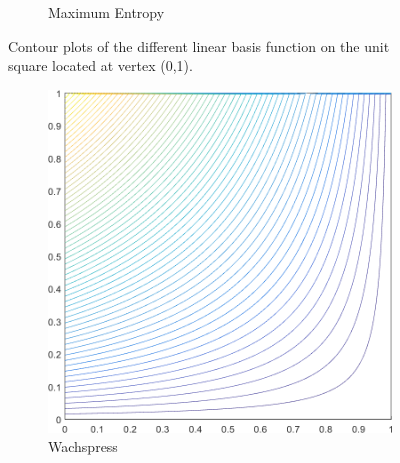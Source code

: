 \begin{figure}
{\begin{subfigure}[b]{0.39\textwidth}
		\caption{Maximum Entropy}
	\end{subfigure}
}
\caption{Contour plots of the different linear basis function on the unit square located at vertex (0,1).}
\label{fig::2D_Linear_Summary_unit_square_basis_functions}
\end{figure}

\begin{figure}
\centering
{
	\begin{subfigure}[b]{0.39\textwidth}
		\centering
		\includegraphics[width=\textwidth]{figures/sec_BF/deg_square_WACHSPRESS1_contour_b5.png}
		\caption{Wachspress}
	\end{subfigure}
	\hspace{1.5cm}
	\begin{subfigure}[b]{0.39\textwidth}
		\centering

\end{subfigure}}
\end{figure}
